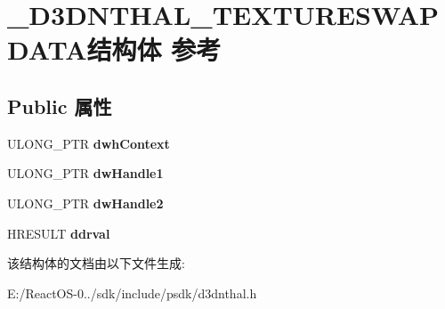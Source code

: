\hypertarget{struct___d3_d_n_t_h_a_l___t_e_x_t_u_r_e_s_w_a_p_d_a_t_a}{}\section{\+\_\+\+D3\+D\+N\+T\+H\+A\+L\+\_\+\+T\+E\+X\+T\+U\+R\+E\+S\+W\+A\+P\+D\+A\+T\+A结构体 参考}
\label{struct___d3_d_n_t_h_a_l___t_e_x_t_u_r_e_s_w_a_p_d_a_t_a}
\subsection*{Public 属性}
\begin{DoxyCompactItemize}
\item 
\mbox{\label{struct___d3_d_n_t_h_a_l___t_e_x_t_u_r_e_s_w_a_p_d_a_t_a_ab5f32fae3bdc6aa685ddcbb9b7f1f81b}} 
U\+L\+O\+N\+G\+\_\+\+P\+TR {\bfseries dwh\+Context}
\item 
\mbox{\label{struct___d3_d_n_t_h_a_l___t_e_x_t_u_r_e_s_w_a_p_d_a_t_a_a6d60ff9ec67e3d6a7b22f78af5061522}} 
U\+L\+O\+N\+G\+\_\+\+P\+TR {\bfseries dw\+Handle1}
\item 
\mbox{\label{struct___d3_d_n_t_h_a_l___t_e_x_t_u_r_e_s_w_a_p_d_a_t_a_af0d9f95e43760f4f20b8af2396d40bb7}} 
U\+L\+O\+N\+G\+\_\+\+P\+TR {\bfseries dw\+Handle2}
\item 
\mbox{\label{struct___d3_d_n_t_h_a_l___t_e_x_t_u_r_e_s_w_a_p_d_a_t_a_ac0f3e48bc67d2d61fe323f5c03f8af33}} 
H\+R\+E\+S\+U\+LT {\bfseries ddrval}
\end{DoxyCompactItemize}


该结构体的文档由以下文件生成\+:\begin{DoxyCompactItemize}
\item 
E\+:/\+React\+O\+S-\/0../sdk/include/psdk/d3dnthal.\+h\end{DoxyCompactItemize}
